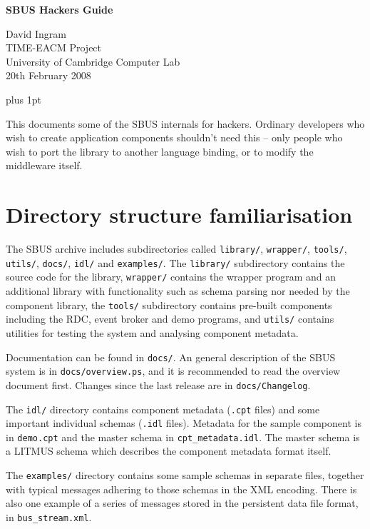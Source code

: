 \documentclass[12pt,a4paper,twoside]{article}
\renewcommand{\_}{\texttt{\symbol{95}}}
\begin{document}
\centerline{\textbf{\LARGE SBUS Hackers Guide}}
\begin{center} \large
David Ingram\\
TIME-EACM Project\\
University of Cambridge Computer Lab\\
20th February 2008\\
\end{center}

{ \parskip 1mm plus 1pt \tableofcontents }
\pagestyle{fancy}

\vspace{5mm}
This documents some of the SBUS internals for hackers.
Ordinary developers who wish to create application components
shouldn't need this -- only people who wish to port the library
to another language binding, or to modify the middleware itself.

\section{Directory structure familiarisation}

The SBUS archive includes subdirectories called \verb^library/^,
\verb^wrapper/^, \verb^tools/^, \verb^utils/^,
\verb^docs/^, \verb^idl/^ and \verb^examples/^. The \verb^library/^
subdirectory contains the source code for the library,
\verb^wrapper/^ contains the wrapper program and an additional library
with functionality such as schema parsing nor needed by the component
library, the \verb^tools/^ subdirectory contains pre-built components
including the RDC, event broker and demo programs, and \verb^utils/^
contains utilities for testing the system and analysing component
metadata.

Documentation can be found in \verb^docs/^.
An general description of the SBUS system is in \verb^docs/overview.ps^,
and it is recommended to read the overview document first.
Changes since the last release are in \verb^docs/Changelog^.

The \verb^idl/^ directory contains component metadata (\verb^.cpt^ files) and
some important individual schemas (\verb^.idl^ files). Metadata for the sample
component is in \verb^demo.cpt^ and the master schema in
\verb^cpt_metadata.idl^. The master schema is a LITMUS schema which describes
the component metadata format itself.

The \verb^examples/^ directory contains
some sample schemas in separate files, together with typical
messages adhering to those schemas in the XML encoding.
There is also one example of a series of messages stored in
the persistent data file format, in \verb^bus_stream.xml^.
\end{document}
